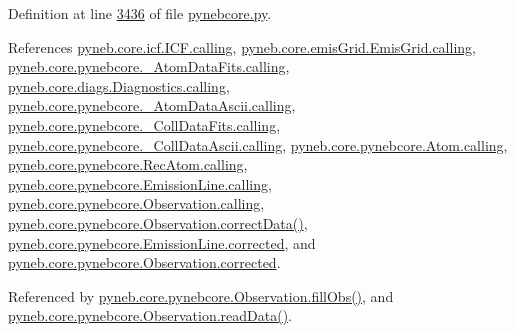 Definition at line \hyperlink{pynebcore_8py_source_l03436}{3436} of file \hyperlink{pynebcore_8py_source}{pynebcore.\+py}.



References \hyperlink{icf_8py_source_l00016}{pyneb.\+core.\+icf.\+I\+C\+F.\+calling}, \hyperlink{emis_grid_8py_source_l00041}{pyneb.\+core.\+emis\+Grid.\+Emis\+Grid.\+calling}, \hyperlink{pynebcore_8py_source_l00090}{pyneb.\+core.\+pynebcore.\+\_\+\+Atom\+Data\+Fits.\+calling}, \hyperlink{diags_8py_source_l00169}{pyneb.\+core.\+diags.\+Diagnostics.\+calling}, \hyperlink{pynebcore_8py_source_l00311}{pyneb.\+core.\+pynebcore.\+\_\+\+Atom\+Data\+Ascii.\+calling}, \hyperlink{pynebcore_8py_source_l00568}{pyneb.\+core.\+pynebcore.\+\_\+\+Coll\+Data\+Fits.\+calling}, \hyperlink{pynebcore_8py_source_l00918}{pyneb.\+core.\+pynebcore.\+\_\+\+Coll\+Data\+Ascii.\+calling}, \hyperlink{pynebcore_8py_source_l01175}{pyneb.\+core.\+pynebcore.\+Atom.\+calling}, \hyperlink{pynebcore_8py_source_l02572}{pyneb.\+core.\+pynebcore.\+Rec\+Atom.\+calling}, \hyperlink{pynebcore_8py_source_l03263}{pyneb.\+core.\+pynebcore.\+Emission\+Line.\+calling}, \hyperlink{pynebcore_8py_source_l03419}{pyneb.\+core.\+pynebcore.\+Observation.\+calling}, \hyperlink{pynebcore_8py_source_l03906}{pyneb.\+core.\+pynebcore.\+Observation.\+correct\+Data()}, \hyperlink{pynebcore_8py_source_l03264}{pyneb.\+core.\+pynebcore.\+Emission\+Line.\+corrected}, and \hyperlink{pynebcore_8py_source_l03423}{pyneb.\+core.\+pynebcore.\+Observation.\+corrected}.



Referenced by \hyperlink{pynebcore_8py_source_l03452}{pyneb.\+core.\+pynebcore.\+Observation.\+fill\+Obs()}, and \hyperlink{pynebcore_8py_source_l03589}{pyneb.\+core.\+pynebcore.\+Observation.\+read\+Data()}.


